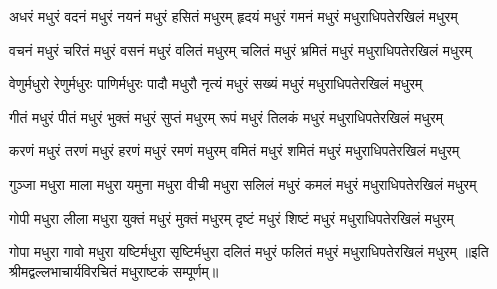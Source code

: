 
\twolineshloka
{अधरं मधुरं वदनं मधुरं नयनं मधुरं हसितं मधुरम्}
{हृदयं मधुरं गमनं मधुरं मधुराधिपतेरखिलं मधुरम्}

\twolineshloka
{वचनं मधुरं चरितं मधुरं वसनं मधुरं वलितं मधुरम्}
{चलितं मधुरं भ्रमितं मधुरं मधुराधिपतेरखिलं मधुरम्}

\twolineshloka
{वेणुर्मधुरो रेणुर्मधुरः पाणिर्मधुरः पादौ मधुरौ}
{नृत्यं मधुरं सख्यं मधुरं मधुराधिपतेरखिलं मधुरम्}

\twolineshloka
{गीतं मधुरं पीतं मधुरं भुक्तं मधुरं सुप्तं मधुरम्}
{रूपं मधुरं तिलकं मधुरं मधुराधिपतेरखिलं मधुरम्}

\twolineshloka
{करणं मधुरं तरणं मधुरं हरणं मधुरं रमणं मधुरम्}
{वमितं मधुरं शमितं मधुरं मधुराधिपतेरखिलं मधुरम्}

\twolineshloka
{गुञ्जा मधुरा माला मधुरा यमुना मधुरा वीची मधुरा}
{सलिलं मधुरं कमलं मधुरं मधुराधिपतेरखिलं मधुरम्}

\twolineshloka
{गोपी मधुरा लीला मधुरा युक्तं मधुरं मुक्तं मधुरम्}
{दृष्टं मधुरं शिष्टं मधुरं मधुराधिपतेरखिलं मधुरम्}

\twolineshloka
{गोपा मधुरा गावो मधुरा यष्टिर्मधुरा सृष्टिर्मधुरा}
{दलितं मधुरं फलितं मधुरं मधुराधिपतेरखिलं मधुरम्}
{॥इति श्रीमद्वल्लभाचार्यविरचितं मधुराष्टकं सम्पूर्णम्॥}
